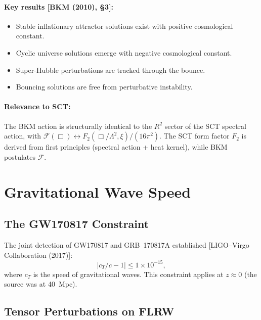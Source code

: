 \documentclass[12pt,a4paper]{article}
\theoremstyle{definition}
\theoremstyle{remark}
\newcommand{\fromlit}[1]{\textcolor{blue!70!black}{\textsf{[#1]}}}
\begin{document}
\paragraph{Key results \fromlit{BKM (2010), \S3}:}
\begin{itemize}[nosep]
  \item Stable inflationary attractor solutions exist with positive
    cosmological constant.
  \item Cyclic universe solutions emerge with negative cosmological
    constant.
  \item Super-Hubble perturbations are tracked through the bounce.
  \item Bouncing solutions are free from perturbative instability.
\end{itemize}

\paragraph{Relevance to SCT:} The BKM action is structurally identical
to the $R^2$ sector of the SCT spectral action, with
$\mathcal{F}(\Box) \leftrightarrow F_2(\Box/\Lambda^2,\xi)/(16\pi^2)$.
The SCT form factor $F_2$ is derived from first principles (spectral
action + heat kernel), while BKM postulates $\mathcal{F}$.

\section{Gravitational Wave Speed}\label{sec:gw-speed}

\subsection{The GW170817 Constraint}

The joint detection of GW170817 and GRB~170817A established
\fromlit{LIGO--Virgo Collaboration (2017)}:
\begin{equation}\label{eq:gw170817}
  \bigl|c_T/c - 1\bigr| \leq 1 \times 10^{-15},
\end{equation}
where $c_T$ is the speed of gravitational waves. This constraint
applies at $z \approx 0$ (the source was at 40~Mpc).

\subsection{Tensor Perturbations on FLRW}\label{sec:tensor-pert}
\end{document}
